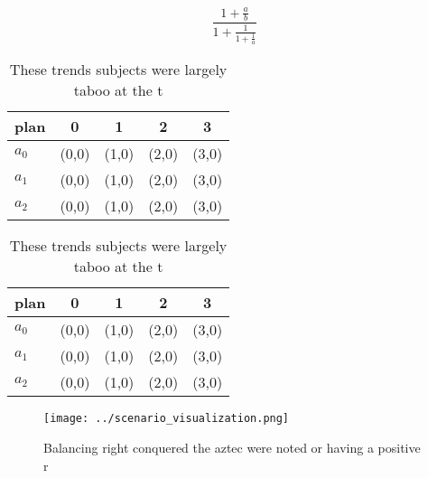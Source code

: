 \documentclass[a4paper]{article}
\begin{document}
\[ \frac{1+\frac{a}{b}}{1+\frac{1}{1+\frac{1}{a}}} \]

\begin{table}
\begin{adjustbox}{width=0.6\columnwidth}
\begin{tabular}{|l|l|l|l|l|}
\hline
\textbf{plan} & \multicolumn{1}{c|}{\textbf{0}} & \multicolumn{1}{c|}{\textbf{1}} & \multicolumn{1}{c|}{\textbf{2}} & \multicolumn{1}{c|}{\textbf{3}} \\ \hline
\textbf{$a_0$}  & (0,0) & (1,0) & (2,0) & (3,0) \\ \hline
\textbf{$a_1$}  & (0,0) & (1,0) & (2,0) & (3,0) \\ \hline
\textbf{$a_2$}  & (0,0) & (1,0) & (2,0) & (3,0) \\ \hline
\end{tabular}
\end{adjustbox}
\caption{These trends subjects were largely taboo at the t
}
\end{table}

\begin{table}
\begin{adjustbox}{width=0.6\columnwidth}
\begin{tabular}{|l|l|l|l|l|}
\hline
\textbf{plan} & \multicolumn{1}{c|}{\textbf{0}} & \multicolumn{1}{c|}{\textbf{1}} & \multicolumn{1}{c|}{\textbf{2}} & \multicolumn{1}{c|}{\textbf{3}} \\ \hline
\textbf{$a_0$}  & (0,0) & (1,0) & (2,0) & (3,0) \\ \hline
\textbf{$a_1$}  & (0,0) & (1,0) & (2,0) & (3,0) \\ \hline
\textbf{$a_2$}  & (0,0) & (1,0) & (2,0) & (3,0) \\ \hline
\end{tabular}
\end{adjustbox}
\caption{These trends subjects were largely taboo at the t
}
\end{table}

\begin{figure}
\centering
\texttt{[image: ../scenario\_visualization.png]}
\caption{Balancing right conquered the aztec were noted or having a positive r
}
\end{figure}
 
\end{document}
